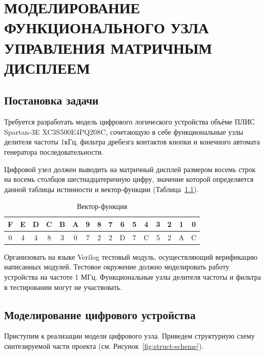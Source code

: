 \chapter{МОДЕЛИРОВАНИЕ ФУНКЦИОНАЛЬНОГО УЗЛА УПРАВЛЕНИЯ МАТРИЧНЫМ ДИСПЛЕЕМ}
\label{cha:lab4}
\section{Постановка задачи}	

Требуется разработать модель цифрового логического устройства объёме ПЛИС Spartan-3E XC3S500E4PQ208C, сочетающую в себе
функциональные узлы делителя частоты 1кГц, фильтра дребезга контактов
кнопки и конечного автомата генератора последовательности.

Цифровой узел должен выводить на матричный дисплей размером восемь строк на восемь столбцов шестнадцатеричную цифру, значение которой определяется данной таблицы истинности и вектор-функции (Таблица~\ref{tab:4func-vector}).




\begin{table}[h!]
	\centering
	\caption{Вектор-функция}
	\begin{tabular}{|c|c|c|c|c|c|c|c|c|c|c|c|c|c|c|c|}
		\hline
		F & E & D & C & B & A & 9 & 8 & 7 & 6 & 5 & 4 & 3 & 2 & 1 & 0 \\ \hline\hline
		0 & 4 & 4 & 8 & 3 & 0 & 7 & 2 & 2 & D & 7 & C & 5 & 2 & A & C \\ \hline
	\end{tabular}
	\label{tab:4func-vector}
\end{table}


Организовать на языке Verilog тестовый модуль, осуществляющий верификацию написанных модулей. Тестовое окружение должно моделировать работу устройства на частоте 1 МГц. Функциональные узлы делителя частоты и фильтра в тестировании могут не участвовать.



\section{Моделирование цифрового устройства}
Приступим к реализации модели цифрового узла. Приведем структурную схему синтезируемой части проекта (см. Рисунок~\ref{fig:struct-scheme}).


